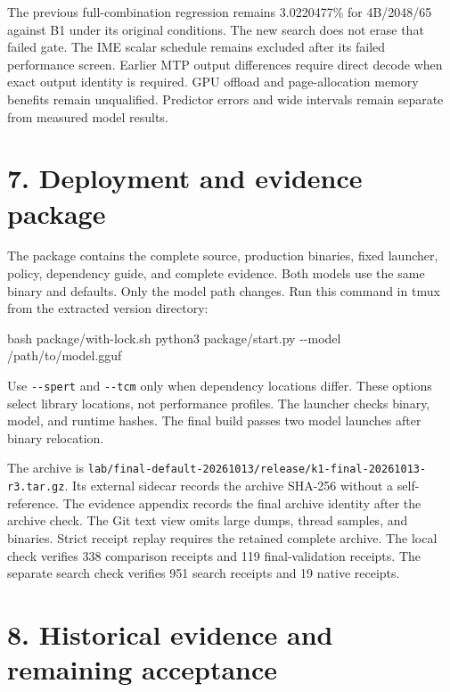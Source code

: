 \documentclass[10pt,a4paper]{article}
\newenvironment{Shaded}{}{}
\newcommand{\FunctionTok}[1]{\textcolor[rgb]{0.02,0.16,0.49}{#1}}
\newcommand{\NormalTok}[1]{#1}
\begin{document}
The previous full-combination regression remains 3.0220477\% for
4B/2048/65 against B1 under its original conditions. The new search does
not erase that failed gate. The IME scalar schedule remains excluded
after its failed performance screen. Earlier MTP output differences
require direct decode when exact output identity is required. GPU
offload and page-allocation memory benefits remain unqualified.
Predictor errors and wide intervals remain separate from measured model
results.

\hypertarget{deployment-and-evidence-package}{%
\section{7. Deployment and evidence
package}\label{deployment-and-evidence-package}}

The package contains the complete source, production binaries, fixed
launcher, policy, dependency guide, and complete evidence. Both models
use the same binary and defaults. Only the model path changes. Run this
command in tmux from the extracted version directory:

\begin{Shaded}
\begin{Highlighting}[]
\FunctionTok{bash}\NormalTok{ package/with{-}lock.sh python3 package/start.py {-}{-}model /path/to/model.gguf}
\end{Highlighting}
\end{Shaded}

Use \nolinkurl{--spert} and \nolinkurl{--tcm} only when dependency
locations differ. These options select library locations, not
performance profiles. The launcher checks binary, model, and runtime
hashes. The final build passes two model launches after binary
relocation.

The archive is
\nolinkurl{lab/final-default-20261013/release/k1-final-20261013-r3.tar.gz}.
Its external sidecar records the archive SHA-256 without a
self-reference. The evidence appendix records the final archive identity
after the archive check. The Git text view omits large dumps, thread
samples, and binaries. Strict receipt replay requires the retained
complete archive. The local check verifies 338 comparison receipts and
119 final-validation receipts. The separate search check verifies 951
search receipts and 19 native receipts.

\hypertarget{historical-evidence-and-remaining-acceptance}{%
\section{8. Historical evidence and remaining
acceptance}\label{historical-evidence-and-remaining-acceptance}}
\end{document}
